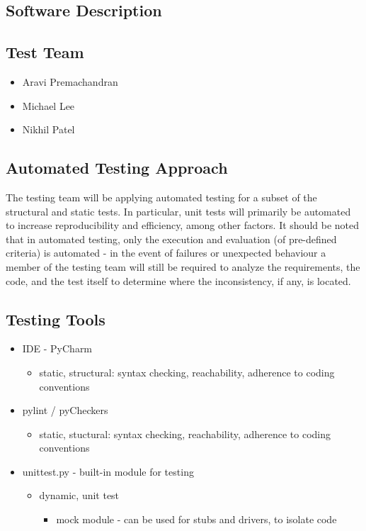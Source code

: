 \documentclass[12pt, titlepage]{article}
\begin{document}
	\subsection{Software Description}

	\subsection{Test Team}
	\begin{itemize}
		\itemsep0em
		\item Aravi Premachandran
		\item Michael Lee
		\item Nikhil Patel
	\end{itemize}
	\subsection{Automated Testing Approach}
	\indent \indent The testing team will be applying automated testing for a 
	subset of the structural and static tests. In particular, unit tests will 
	primarily be automated to increase reproducibility and efficiency, among 
	other factors. It should be noted that in automated testing, only the 
	execution and evaluation (of pre-defined criteria) is automated - in the 
	event of failures or unexpected behaviour a member of the testing team will 
	still be required to analyze the requirements, the code, and the test 
	itself to determine where the inconsistency, if any, is located.
	
	\subsection{Testing Tools}
	\begin{itemize}
		\itemsep0em
		\item IDE - PyCharm
		\vspace{-3mm}
		\begin{itemize}
			\item static, structural: syntax checking, reachability, adherence 
			to coding conventions
		\end{itemize}
		\item pylint / pyCheckers
		\vspace{-3mm}
		\begin{itemize}
			\item static, stuctural: syntax checking, reachability, adherence 
			to coding conventions
		\end{itemize}
		\item unittest.py - built-in module for testing
		\vspace{-3mm}
		\begin{itemize}
			\item dynamic, unit test
			\vspace{-2mm}
			\begin{itemize}
				\item mock module - can be used for stubs and drivers, to 
				isolate code
			\end{itemize}
		\end{itemize}
	\end{itemize}
		
\end{document}
